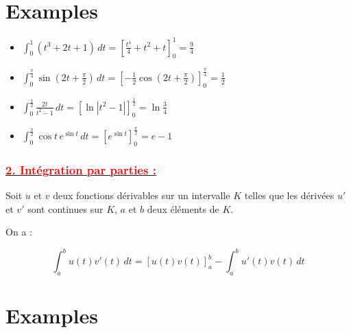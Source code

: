 \documentclass[12pt]{article}
\begin{document}
\section*{Examples}

\begin{itemize}
    \item \( \int_0^1 \left( t^3 + 2t + 1 \right) \, dt = \left[ \frac{t^4}{4} + t^2 + t \right]_0^1 = \frac{9}{4} \)
    
    \item \( \int_0^{\frac{\pi}{4}} \sin \left( 2t + \frac{\pi}{2} \right) \, dt = \left[ -\frac{1}{2} \cos \left( 2t + \frac{\pi}{2} \right) \right]_0^{\frac{\pi}{4}} = \frac{1}{2} \)
    
    \item \( \int_0^{\frac{1}{2}} \frac{2t}{t^2 - 1} \, dt = \left[ \ln |t^2 - 1| \right]_0^{\frac{1}{2}} = \ln \frac{3}{4} \)
    
    \item \( \int_0^{\frac{\pi}{2}} \cos t \, e^{\sin t} \, dt = \left[ e^{\sin t} \right]_0^{\frac{\pi}{2}} = e - 1 \)
\end{itemize}

\subsubsection*{\underline{\textcolor{red}{2. Intégration par parties :}}}
Soit \( u \) et \( v \) deux fonctions dérivables sur un intervalle \( K \) telles que les dérivées \( u' \) et \( v' \) sont continues sur \( K \), \( a \) et \( b \) deux éléments de \( K \).

On a :

\[
\int_a^b u(t) v'(t) \, dt = \left[ u(t) v(t) \right]_a^b - \int_a^b u'(t) v(t) \, dt
\]

\section*{Examples}
\end{document}
